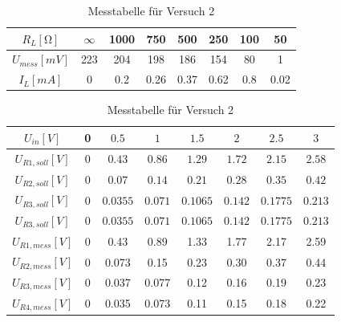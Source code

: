 \documentclass[a4paper]{article}
\begin{document}
\begin{table}[ht]
    \centering
    \begin{tabular}{| c | c | c | c | c | c | c | c |}
        \hline
         $R_L [\si{\ohm}]$ & $\infty$ & 1000 & 750 & 500 & 250 & 100 & 50\\\hline
         $U_{mess} [\si{mV}]$ & 223 & 204 & 198 & 186 & 154 & 80 & 1\\\hline
         $I_{L} [\si{mA}]$ & 0 & 0.2 & 0.26 & 0.37 & 0.62 & 0.8 & 0.02\\\hline
    \end{tabular}
    \caption{Messtabelle für Versuch 2}
    \label{tab:messtab2_1}
\end{table}

\begin{table}[ht]
    \centering
    \begin{tabular}{| c | c | c | c | c | c | c | c |}
        \hline
         $U_{in} [\si{V}]$ & 0 & $0.5$ & $1$ & $1.5$ & $2$ & $2.5$ & $3$ \\\hline
         $U_{R1,soll} [\si{V}]$ & 0 & $0.43$ & $0.86$ & $1.29$ & $1.72$ & $2.15$ & $2.58$ \\\hline %
         $U_{R2,soll} [\si{V}]$ & $0$ & $0.07$ & $0.14$ & $0.21$ & $0.28$ & $0.35$ & $0.42$ \\\hline
         $U_{R3,soll} [\si{V}]$ & 0 & $0.0355$ & $0.071$ & $0.1065$ & $0.142$ & $0.1775$ & $0.213$ \\\hline
         $U_{R3,soll} [\si{V}]$ & 0 & $0.0355$ & $0.071$ & $0.1065$ & $0.142$ & $0.1775$ & $0.213$ \\\hline
         $U_{R1,mess} [\si{V}]$ & 0 & 0.43 & 0.89 & 1.33 & 1.77 & 2.17 & 2.59 \\\hline
         $U_{R2,mess} [\si{V}]$ & 0 & 0.073 & 0.15 & 0.23 & 0.30 & 0.37 & 0.44\\\hline
         $U_{R3,mess} [\si{V}]$ & 0 & 0.037 & 0.077 & 0.12 & 0.16 & 0.19 & 0.23\\\hline
         $U_{R4,mess} [\si{V}]$ & 0 & 0.035 & 0.073 & 0.11 & 0.15 & 0.18 & 0.22 \\\hline
    \end{tabular}
    \caption{Messtabelle für Versuch 2}
    \label{tab:messtab2_2}
\end{table}
\end{document}

